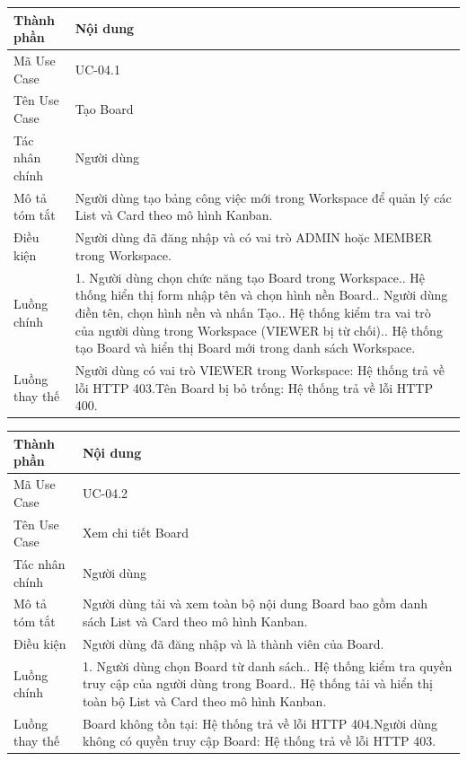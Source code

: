 \vspace{0.3cm}
\noindent\begin{tabular}{|p{3.5cm}|p{10.5cm}|}
\hline
\textbf{Thành phần} & \textbf{Nội dung} \\
\hline
Mã Use Case & UC-04.1 \\
\hline
Tên Use Case & Tạo Board \\
\hline
Tác nhân chính & Người dùng \\
\hline
Mô tả tóm tắt & Người dùng tạo bảng công việc mới trong Workspace để quản lý các List và Card theo mô hình Kanban. \\
\hline
Điều kiện & Người dùng đã đăng nhập và có vai trò ADMIN hoặc MEMBER trong Workspace. \\
\hline
Luồng chính & 1. Người dùng chọn chức năng tạo Board trong Workspace.\newline 2. Hệ thống hiển thị form nhập tên và chọn hình nền Board.\newline 3. Người dùng điền tên, chọn hình nền và nhấn Tạo.\newline 4. Hệ thống kiểm tra vai trò của người dùng trong Workspace (VIEWER bị từ chối).\newline 5. Hệ thống tạo Board và hiển thị Board mới trong danh sách Workspace. \\
\hline
Luồng thay thế & Người dùng có vai trò VIEWER trong Workspace: Hệ thống trả về lỗi HTTP 403.\newline Tên Board bị bỏ trống: Hệ thống trả về lỗi HTTP 400. \\
\hline
\end{tabular}

\vspace{0.5cm}
\noindent\begin{tabular}{|p{3.5cm}|p{10.5cm}|}
\hline
\textbf{Thành phần} & \textbf{Nội dung} \\
\hline
Mã Use Case & UC-04.2 \\
\hline
Tên Use Case & Xem chi tiết Board \\
\hline
Tác nhân chính & Người dùng \\
\hline
Mô tả tóm tắt & Người dùng tải và xem toàn bộ nội dung Board bao gồm danh sách List và Card theo mô hình Kanban. \\
\hline
Điều kiện & Người dùng đã đăng nhập và là thành viên của Board. \\
\hline
Luồng chính & 1. Người dùng chọn Board từ danh sách.\newline 2. Hệ thống kiểm tra quyền truy cập của người dùng trong Board.\newline 3. Hệ thống tải và hiển thị toàn bộ List và Card theo mô hình Kanban. \\
\hline
Luồng thay thế & Board không tồn tại: Hệ thống trả về lỗi HTTP 404.\newline Người dùng không có quyền truy cập Board: Hệ thống trả về lỗi HTTP 403. \\
\hline
\end{tabular}

